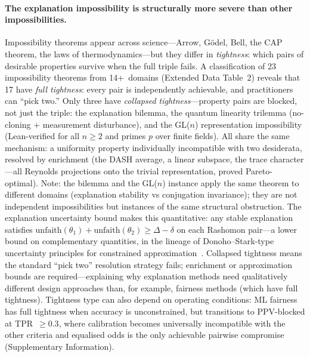\documentclass[11pt]{article}
\begin{document}
\paragraph{The explanation impossibility is structurally more severe than other impossibilities.}
Impossibility theorems appear across science---Arrow, G\"odel, Bell,
the CAP theorem, the laws of thermodynamics---but they differ in
\emph{tightness}: which pairs of desirable properties survive when the
full triple fails.  A classification of 23 impossibility theorems from
14+~domains (Extended Data Table~2) reveals that 17 have \emph{full
tightness}: every pair is independently achievable, and practitioners
can ``pick two.''  Only three have \emph{collapsed tightness}---property
pairs are blocked, not just the triple: the explanation bilemma, the
quantum linearity trilemma (no-cloning $+$ measurement disturbance),
and the GL($n$) representation impossibility (Lean-verified for all
$n \geq 2$ and primes $p$ over finite fields).  All share the same
mechanism: a uniformity property individually incompatible with two
desiderata, resolved by enrichment (the DASH average, a linear
subspace, the trace character---all Reynolds projections onto the
trivial representation, proved Pareto-optimal).
Note: the bilemma and the GL($n$) instance apply the same theorem to
different domains (explanation stability vs conjugation invariance);
they are not independent impossibilities but instances of the same
structural obstruction.
The explanation uncertainty bound makes this
quantitative: any stable explanation satisfies
$\mathrm{unfaith}(\theta_1) + \mathrm{unfaith}(\theta_2) \geq \Delta -
\delta$ on each Rashomon pair---a lower bound on complementary
quantities, in the lineage of Donoho--Stark-type uncertainty principles
for constrained approximation~\citep{donoho1989uncertainty}.  Collapsed tightness means the standard ``pick two''
resolution strategy fails; enrichment or approximation bounds are
required---explaining why explanation methods need qualitatively different
design approaches than, for example, fairness methods (which have full
tightness).  Tightness type can also depend on operating conditions: ML
fairness has full tightness when accuracy is unconstrained, but
transitions to PPV-blocked at TPR~$\geq 0.3$, where calibration becomes
universally incompatible with the other criteria and equalised odds is
the only achievable pairwise compromise (Supplementary Information).
\end{document}
